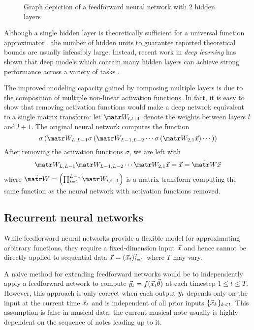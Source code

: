 \begin{figure}[tb]
    \centering
    
    \caption{Graph depiction of a feedforward neural network with $2$ hidden layers}
    \label{fig:nn-ffw}
\end{figure}

Although a single hidden layer is theoretically sufficient for a universal
function approximator \citep{Cybenko1993}, the number of hidden units to
guarantee reported theoretical bounds are usually infeasibly large. Instead,
recent work in \emph{deep learning} has shown that deep models which contain
many hidden layers can achieve strong performance across a variety of
tasks \citep{Bengio2011}.

The improved modeling capacity gained by composing multiple layers is due to
the composition of multiple non-linear activation functions.
In fact, it is easy to show that removing activation functions would make
a deep network equivalent to a single matrix transform: let $\W_{l,l+1}$
denote the weights between layers $l$ and $l+1$. The original neural network
computes the function
\begin{equation}
    \sigma\left(
        \W_{L,L-1} \sigma \left(
            \W_{L-1,L-2}\cdots \sigma \left(
                \W_{2,1} \x
            \right) \cdots
        \right)
    \right)
\end{equation}
After removing the activation functions $\sigma$, we are left with
\begin{equation}
    \W_{L,L-1} \W_{L-1,L-2}\cdots \W_{2,1} \x
    = \x
    = \tilde{\W} \x
\end{equation}
where $\tilde{\W} = \left(\prod_{i=1}^{L-1} \W_{i,i+1} \right)$
is a matrix transform computing the same function as the neural network with
activation functions removed.

\subsection{Recurrent neural networks}

While feedforward neural networks provide a flexible model for approximating
arbitrary functions, they require a fixed-dimension input $\vec{x}$ and hence
cannot be directly applied to sequential data $\vec{x} = (\vec{x}_t)_{t=1}^T$ where $T$ may
vary.

A naive method for extending feedforward networks would be to independently
apply a feedforward network to compute $\vec{y}_t = f(\vec{x}_t \vec{\theta})$ at each timestep
$1 \leq t \leq T$. However, this approach is only correct when each output
$\vec{y}_t$ depends only on the input at the current time $\vec{x}_t$ and is independent of
all prior inputs $\{\vec{x}_k\}_{k < t}$. This assumption is false in musical data:
the current musical note usually is highly dependent on the sequence of notes
leading up to it.


